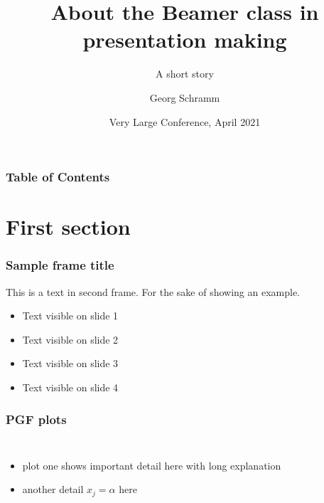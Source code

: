 \documentclass[8pt,aspectratio=169,xcolor=dvipsnames]{beamer} %
\title[About Beamer] %
{\textbf{About the Beamer class in presentation making}}
\subtitle{A short story}
\author[Schramm, Georg] %
{Georg Schramm\inst{1}}
\institute[KUL] %
{
  \inst{1}%
  Department of Imaging and Pathology\\
  KU Leuven
}
\date[VLC 2021] %
{Very Large Conference, April 2021}
\begin{document}
\frame{\titlepage}


\begin{frame}
\frametitle{Table of Contents}
\tableofcontents
\end{frame}


\section{First section}

\begin{frame}
\frametitle{Sample frame title}
This is a text in second frame. For the sake of showing an example.

\begin{itemize}
    \item<1-> Text visible on slide 1
    \item<2-> Text visible on slide 2
    \item<3>  Text visible on slide 3
    \item<4-> Text visible on slide 4
\end{itemize}
\end{frame}

\begin{frame}
\frametitle{PGF plots}

\begin{columns}
  \begin{itemize}
    \item plot one shows important detail here with long explanation
    \item another detail $x_j = \alpha$ here
  \end{itemize}

  
  \begin{center}
  \end{center}
\end{columns}

\end{frame}
\end{document}
